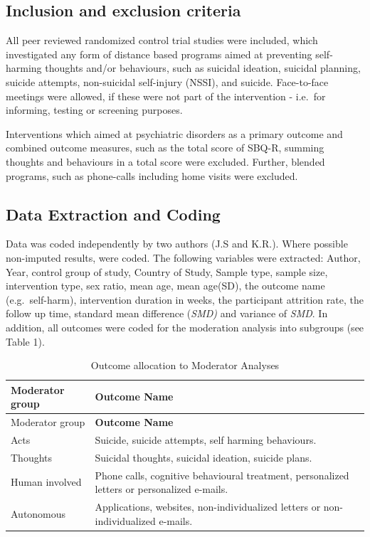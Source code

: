 \documentclass[
  english,
  man]{apa6}
\begin{document}
\hypertarget{inclusion-and-exclusion-criteria}{%
\subsection{Inclusion and exclusion criteria}\label{inclusion-and-exclusion-criteria}}

All peer reviewed randomized control trial studies were included, which investigated any form of distance based programs aimed at preventing self-harming thoughts and/or behaviours, such as suicidal ideation, suicidal planning, suicide attempts, non-suicidal self-injury (NSSI), and suicide. Face-to-face meetings were allowed, if these were not part of the intervention - i.e.~for informing, testing or screening purposes.

Interventions which aimed at psychiatric disorders as a primary outcome and combined outcome measures, such as the total score of SBQ-R, summing thoughts and behaviours in a total score were excluded. Further, blended programs, such as phone-calls including home visits were excluded.

\hypertarget{data-extraction-and-coding}{%
\subsection{Data Extraction and Coding}\label{data-extraction-and-coding}}

Data was coded independently by two authors (J.S and K.R.). Where possible non-imputed results, were coded. The following variables were extracted: Author, Year, control group of study, Country of Study, Sample type, sample size, intervention type, sex ratio, mean age, mean age(SD), the outcome name (e.g.~self-harm), intervention duration in weeks, the participant attrition rate, the follow up time, standard mean difference (\emph{SMD)} and variance of \emph{SMD}. In addition, all outcomes were coded for the moderation analysis into subgroups (see Table 1).

\begin{longtable}[]{@{}
  >{\raggedright\arraybackslash}p{}
  >{\raggedright\arraybackslash}p{}@{}}
\caption{Outcome allocation to Moderator Analyses}\tabularnewline
\toprule
Moderator group & \textbf{Outcome Name} \\
\midrule
\endfirsthead
\toprule
Moderator group & \textbf{Outcome Name} \\
\midrule
\endhead
Acts & Suicide, suicide attempts, self harming behaviours. \\
Thoughts & Suicidal thoughts, suicidal ideation, suicide plans. \\
Human involved & Phone calls, cognitive behavioural treatment, personalized letters or personalized e-mails. \\
Autonomous & Applications, websites, non-individualized letters or non-individualized e-mails. \\
\bottomrule
\end{longtable}
\end{document}
